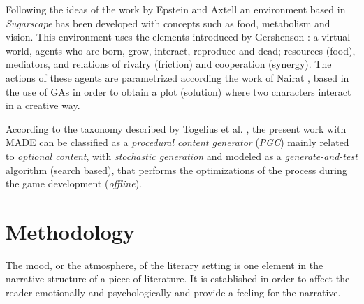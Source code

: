 \documentclass{sig-alternate}
\begin{document}
Following the ideas of the work by Epstein and Axtell
\cite{epstein1996growing} an environment based in {\em Sugarscape} has %
been developed with concepts such as food, metabolism and
vision. This environment uses the elements introduced by Gershenson
\cite{gershenson2005general}: a virtual world, agents who are born, grow, 
interact, reproduce and dead; resources (food), mediators, and
relations of rivalry (friction) and cooperation (synergy). The actions
of these agents are parametrized according the work of Nairat
\cite{nairat2011character}, based in the use of GAs in order to
obtain a plot (solution) where two characters interact in a creative way. %

According to the taxonomy described by Togelius et al. \cite{Togelius2011}, the present work
with MADE can be classified as a \textit{procedural content generator} (\textit{PGC})
mainly related to \textit{optional content}, with \textit{stochastic generation}
and modeled as a \textit{generate-and-test} algorithm (search based), that
performs the optimizations of the process during the game development (\textit{offline}).




%
%

\section{Methodology}
\label{sec:methodology}

The mood, or the atmosphere, of the literary setting is one element in the narrative structure of a piece of literature. It is established in order to affect the reader emotionally and psychologically and provide a feeling for the narrative.
\\
\end{document}
